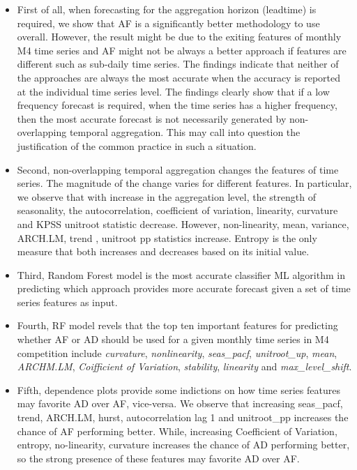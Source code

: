 \documentclass[]{elsarticle} %
\begin{document}
\begin{itemize}
\item
  First of all, when forecasting for the aggregation horizon (leadtime)
  is required, we show that AF is a significantly better methodology to
  use overall. However, the result might be due to the exiting features
  of monthly M4 time series and AF might not be always a better approach
  if features are different such as sub-daily time series. The findings
  indicate that neither of the approaches are always the most accurate
  when the accuracy is reported at the individual time series level. The
  findings clearly show that if a low frequency forecast is required,
  when the time series has a higher frequency, then the most accurate
  forecast is not necessarily generated by non-overlapping temporal
  aggregation. This may call into question the justification of the
  common practice in such a situation.
\item
  Second, non-overlapping temporal aggregation changes the features of
  time series. The magnitude of the change varies for different
  features. In particular, we observe that with increase in the
  aggregation level, the strength of seasonality, the autocorrelation,
  coefficient of variation, linearity, curvature and KPSS unitroot
  statistic decrease. However, non-linearity, mean, variance, ARCH.LM,
  trend , unitroot pp statistics increase. Entropy is the only measure
  that both increases and decreases based on its initial value.
\item
  Third, Random Forest model is the most accurate classifier ML
  algorithm in predicting which approach provides more accurate forecast
  given a set of time series features as input.
\item
  Fourth, RF model revels that the top ten important features for
  predicting whether AF or AD should be used for a given monthly time
  series in M4 competition include \emph{curvature},
  \emph{nonlinearity}, \emph{seas\_pacf}, \emph{unitroot\_up},
  \emph{mean}, \emph{ARCHM.LM}, \emph{Coifficient of Variation},
  \emph{stability}, \emph{linearity} and \emph{max\_level\_shift}.
\item
  Fifth, dependence plots provide some indictions on how time series
  features may favorite AD over AF, vice-versa. We observe that
  increasing seas\_pacf, trend, ARCH.LM, hurst, autocorrelation lag 1
  and unitroot\_pp increases the chance of AF performing better. While,
  increasing Coefficient of Variation, entropy, no-linearity, curvature
  increases the chance of AD performing better, so the strong presence
  of these features may favorite AD over AF.
\end{itemize}
\end{document}
